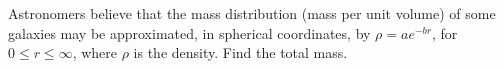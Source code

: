 Astronomers believe that the mass distribution (mass per unit volume) of some galaxies may be 
approximated, in spherical coordinates, by $\rho=ae^{-br}$, for $0\le r\le\infty$, where $\rho$
is the density.
Find the total mass.\answercheck

